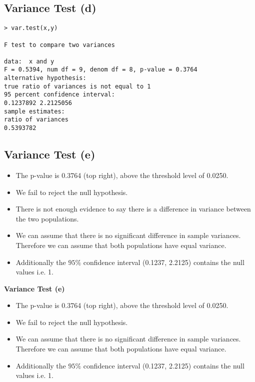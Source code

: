 \documentclass[]{report}
\begin{document}

\subsection{Variance Test (d)}
\begin{verbatim}
> var.test(x,y)

F test to compare two variances

data:  x and y
F = 0.5394, num df = 9, denom df = 8, p-value = 0.3764
alternative hypothesis: 
true ratio of variances is not equal to 1
95 percent confidence interval:
0.1237892 2.2125056
sample estimates:
ratio of variances
0.5393782
\end{verbatim}




\subsection{Variance Test (e)}
\begin{itemize}
	\item The p-value is 0.3764 (top right), above the threshold level of 0.0250.
	\item We fail to reject the null hypothesis.
	\item There is not enough evidence to say there is a difference in variance between the two populations.
	\smallskip
	\item We can assume that there is no significant difference in sample variances. Therefore we can assume that both populations have equal variance.
	\item Additionally the $95\%$ confidence interval (0.1237, 2.2125) contains the null values i.e. 1.
\end{itemize}









\textbf{Variance Test (e)}
\begin{itemize}
	\item The p-value is 0.3764 (top right), above the threshold level of 0.0250.
	\item We fail to reject the null hypothesis.
	\item We can assume that there is no significant difference in sample variances. Therefore we can assume that both populations have equal variance.
	\item Additionally the $95\%$ confidence interval (0.1237, 2.2125) contains the null values i.e. 1.
\end{itemize}
\end{document}
